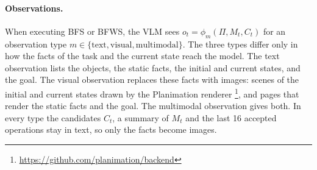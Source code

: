 \paragraph{Observations.} When executing BFS or BFWS, the VLM sees $o_t=\phi_m(\Pi, M_t, C_t)$ for an observation type $m\in\{\text{text},\text{visual},\text{multimodal}\}$. The three types differ only in how the facts of the task and the current state reach the model. The text observation lists the objects, the static facts, the initial and current states, and the goal. The visual observation replaces these facts with images: scenes of the initial and current states drawn by the Planimation renderer \citep{chen2020planimation}\footnote{\url{https://github.com/planimation/backend}}, and pages that render the static facts and the goal. The multimodal observation gives both. In every type the candidates $C_t$, a summary of $M_t$ and the last 16 accepted operations stay in text, so only the facts become images.

